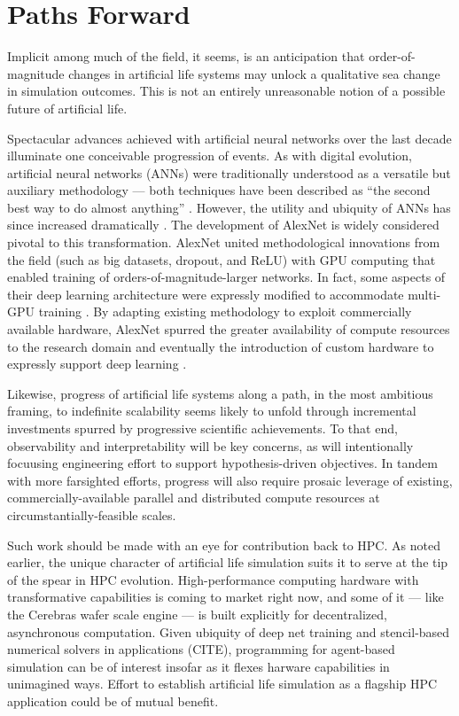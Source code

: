 \section{Paths Forward}

Implicit among much of the field, it seems, is an anticipation that order-of-magnitude changes in artificial life systems may unlock a qualitative sea change in simulation outcomes.
This is not an entirely unreasonable notion of a possible future of artificial life.

Spectacular advances achieved with artificial neural networks over the last decade illuminate one conceivable progression of events.
As with digital evolution, artificial neural networks (ANNs) were traditionally understood as a versatile but auxiliary methodology --- both techniques have been described as ``the second best way to do almost anything'' \citep{miaoulis2008intelligent,eiben2015introduction}.
However, the utility and ubiquity of ANNs has since increased dramatically \citep{marcus2018deep}.
The development of AlexNet is widely considered pivotal to this transformation.
AlexNet united methodological innovations from the field (such as big datasets, dropout, and ReLU) with GPU computing that enabled training of orders-of-magnitude-larger networks.
In fact, some aspects of their deep learning architecture were expressly modified to accommodate multi-GPU training \citep{krizhevsky2012imagenet}.
By adapting existing methodology to exploit commercially available hardware, AlexNet spurred the greater availability of compute resources to the research domain and eventually the introduction of custom hardware to expressly support deep learning \citep{jouppi2017datacenter}.

Likewise, progress of artificial life systems along a path, in the most ambitious framing, to indefinite scalability seems likely to unfold through incremental investments spurred by progressive scientific achievements.
To that end, observability \citep{moreno2023toward} and interpretability \citep{horgan1995complexity} will be key concerns, as will intentionally focuusing engineering effort to support hypothesis-driven objectives.
In tandem with more farsighted efforts, progress will also require prosaic leverage of existing, commercially-available parallel and distributed compute resources at circumstantially-feasible scales.

Such work should be made with an eye for contribution back to HPC.
As noted earlier, the unique character of artificial life simulation suits it to serve at the tip of the spear in HPC evolution.
High-performance computing hardware with transformative capabilities is coming to market right now, and some of it --- like the Cerebras wafer scale engine \citep{lauterbach2021path} --- is built explicitly for decentralized, asynchronous computation.
Given ubiquity of deep net training and stencil-based numerical solvers in applications (CITE), programming for agent-based simulation can be of interest insofar as it flexes harware capabilities in unimagined ways.
Effort to establish artificial life simulation as a flagship HPC application could be of mutual benefit.


